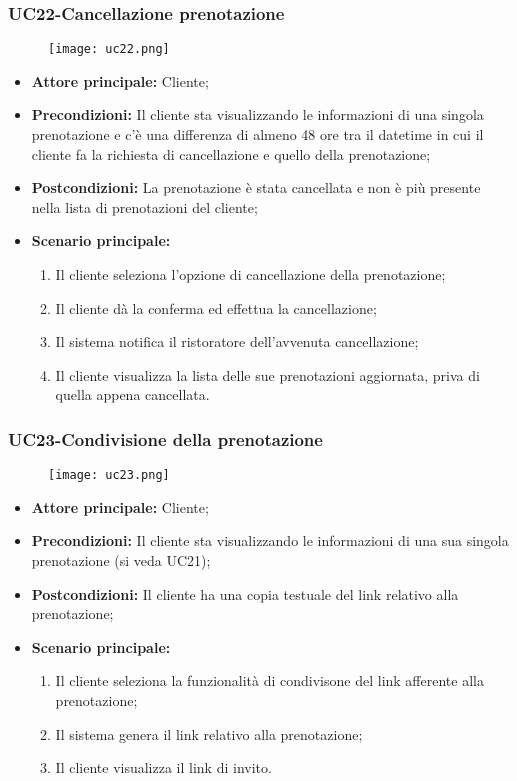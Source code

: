 \subsubsection{UC22-Cancellazione prenotazione}
\begin{figure}[h] \texttt{[image: uc22.png]} \end{figure}
\begin{itemize}
    \item \textbf{Attore principale:} Cliente;
    \item \textbf{Precondizioni:} Il cliente sta visualizzando le informazioni di una singola prenotazione e c'è una differenza di almeno 48 ore tra il datetime in cui il cliente fa la richiesta di cancellazione e quello della prenotazione;
    \item \textbf{Postcondizioni:} La prenotazione è stata cancellata e non è più presente nella lista di prenotazioni del cliente;
    \item \textbf{Scenario principale:}
        \begin{enumerate}
            \item Il cliente seleziona l'opzione di cancellazione della prenotazione;
            \item Il cliente dà la conferma ed effettua la cancellazione;
            \item Il sistema notifica il ristoratore dell'avvenuta cancellazione;
            \item Il cliente visualizza la lista delle sue prenotazioni aggiornata, priva di quella appena cancellata.
        \end{enumerate}
\end{itemize}

\subsubsection{UC23-Condivisione della prenotazione}
\begin{figure}[h] \texttt{[image: uc23.png]} \end{figure}
\begin{itemize}
    \item \textbf{Attore principale:} Cliente;
    \item \textbf{Precondizioni:} Il cliente sta visualizzando le informazioni di una sua singola prenotazione (si veda UC21);
    \item \textbf{Postcondizioni:} Il cliente ha una copia testuale del link relativo alla prenotazione;
    \item \textbf{Scenario principale:}
        \begin{enumerate}
            \item Il cliente seleziona la funzionalità di condivisone del link afferente alla prenotazione;
            \item Il sistema genera il link relativo alla prenotazione;
            \item Il cliente visualizza il link di invito.
        \end{enumerate}
\end{itemize}

